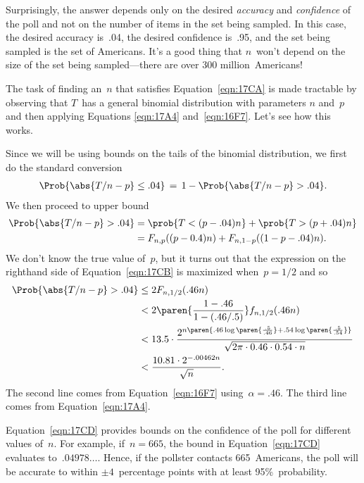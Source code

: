 \begin{editingnotes}
Surprisingly, the answer depends only on the desired \emph{accuracy}
and \emph{confidence} of the poll and not on the number of items in
the set being sampled.  In this case, the desired accuracy is~.04, the
desired confidence is~.95, and the set being sampled is the set of
Americans.  It's a good thing that $n$~won't depend on the size of the
set being sampled---there are over 300 million~Americans!

The task of finding an~$n$ that satisfies Equation~\ref{eqn:17CA} is
made tractable by observing that $T$~has a general binomial
distribution with parameters $n$ and~$p$ and then applying Equations
\ref{eqn:17A4} and~\ref{eqn:16F7}.  Let's see how this works.

Since we will be using bounds on the tails of the binomial
distribution, we first do the standard conversion
\begin{equation*}
\Prob{\strut\abs{T/n - p} \le .04}
    \,=\, 1 - \Prob{\strut \abs{T/n - p} > .04}.
\end{equation*}
We then proceed to upper bound
\begin{align}
\Prob{\abs{T/n - p} > .04}
    & = \prob{T < (p - .04) n} + \prob{T > (p + .04) n} \notag\\
    &= F_{n, p}((p - 0.4)n) + F_{n, 1-p}((1 - p - .04) n).
        \label{eqn:17CB}
\end{align}
We don't know the true value of~$p$, but it turns out that the
expression on the righthand side of Equation~\ref{eqn:17CB} is
maximized when~$p = 1/2$ and so
\begingroup
\openup\jot
\begin{align}
\Prob{\strut \abs{T/n - p} > .04}
    &\le 2 F_{n, 1/2}(.46n) \notag\\
    &<   2 \paren{\frac{1 - .46}{1 - (.46/.5)}} f_{n, 1/2}(.46n)
        \notag\\
    &< 13.5 \cdot 
        \frac{ 2^{n \paren{.46 \log\paren{\frac{.5}{.46}}
                         + .54 \log\paren{\frac{.5}{.54}} } } }
             {\sqrt{2\pi \cdot 0.46 \cdot 0.54 \cdot n}} \notag\\
    & < \frac{ 10.81 \cdot 2^{-.00462 n} }{ \sqrt{n} }.
        \label{eqn:17CD}
\end{align}
\endgroup
The second line comes from Equation~\ref{eqn:16F7} using~$\alpha =
.46$.  The third line comes from Equation~\ref{eqn:17A4}.

Equation~\ref{eqn:17CD} provides bounds on the confidence of the poll
for different values of~$n$.  For example, if~$n = 665$, the bound in
Equation~\ref{eqn:17CD} evaluates to~$.04978\dots$.  Hence, if the
pollster contacts 665~Americans, the poll will be accurate to within
$\pm 4$~percentage points with at least 95\%~probability.


\end{editingnotes}

